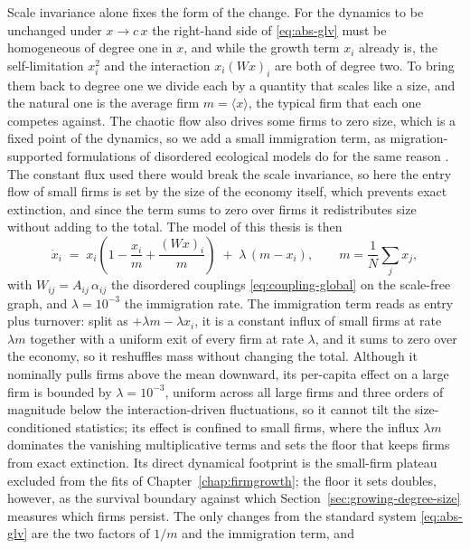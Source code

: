 Scale invariance alone fixes the form of the change. For the dynamics to be unchanged under
$x \to c\,x$ the right-hand side of \eqref{eq:abs-glv} must be homogeneous of degree one in $x$,
and while the growth term $x_i$ already is, the self-limitation $x_i^2$ and the interaction
$x_i (Wx)_i$ are both of degree two. To bring them back to degree one we divide each by a quantity
that scales like a size, and the natural one is the average firm $m = \langle x\rangle$, the
typical firm that each one competes against. The chaotic flow also drives some firms to
zero size, which is a fixed point of the dynamics, so we add a small immigration term, as
migration-supported formulations of disordered ecological models do for the same reason
\citep{bunin2017,arnouxbunin2024}. The constant flux used there would break the scale
invariance, so here the entry flow of small firms is set by the size of the economy itself,
which prevents exact extinction, and since the term sums to zero over firms it redistributes
size without adding to the total. The model of this thesis is then
\begin{equation}
    \dot{x}_i \;=\; x_i \left( 1 - \frac{x_i}{m} + \frac{(Wx)_i}{m} \right)
    \;+\; \lambda\,( m - x_i ),
    \qquad m = \frac{1}{N}\sum_j x_j ,
    \label{eq:relative-glv}
\end{equation}
with $W_{ij} = A_{ij}\,\alpha_{ij}$ the disordered couplings \eqref{eq:coupling-global} on the
scale-free graph, and $\lambda = 10^{-3}$ the immigration rate. The immigration term reads as
entry plus turnover: split as $+\lambda m - \lambda x_i$, it is a constant influx of small firms
at rate $\lambda m$ together with a uniform exit of every firm at rate $\lambda$, and it sums to
zero over the economy, so it reshuffles mass without changing the total. Although it nominally
pulls firms above the mean downward, its per-capita effect on a large firm is bounded by
$\lambda = 10^{-3}$, uniform across all large firms and three orders of magnitude below the
interaction-driven fluctuations, so it cannot tilt the size-conditioned statistics; its effect
is confined to small firms, where the influx $\lambda m$ dominates the vanishing multiplicative terms
and sets the floor that keeps firms from exact extinction. Its direct dynamical footprint is
the small-firm plateau excluded from the fits of Chapter~\ref{chap:firmgrowth}; the
floor it sets doubles, however, as the survival boundary against which
Section~\ref{sec:growing-degree-size} measures which firms persist. The only changes
from the
standard system \eqref{eq:abs-glv} are the two factors of $1/m$ and the immigration term, and
